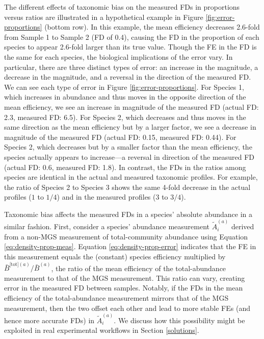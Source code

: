 \documentclass[
]{article}
\begin{document}
The different effects of taxonomic bias on the measured FDs in proportions versus ratios are illustrated in a hypothetical example in Figure \ref{fig:error-proportions} (bottom row).
In this example, the mean efficiency decreases 2.6-fold from Sample 1 to Sample 2 (FD of 0.4), causing the FD in the proportion of each species to appear 2.6-fold larger than its true value.
Though the FE in the FD is the same for each species, the biological implications of the error vary.
In particular, there are three distinct types of error: an increase in the magnitude, a decrease in the magnitude, and a reversal in the direction of the measured FD.
We can see each type of error in Figure \ref{fig:error-proportions}.
For Species 1, which increases in abundance and thus moves in the opposite direction of the mean efficiency, we see an increase in magnitude of the measured FD (actual FD: 2.3, measured FD: 6.5).
For Species 2, which decreases and thus moves in the same direction as the mean efficiency but by a larger factor, we see a decrease in magnitude of the measured FD (actual FD: 0.15, measured FD: 0.44).
For Species 2, which decreases but by a smaller factor than the mean efficiency, the species actually appears to increase---a reversal in direction of the measured FD (actual FD: 0.6, measured FD: 1.8).
In contrast, the FDs in the ratios among species are identical in the actual and measured taxonomic profiles.
For example, the ratio of Species 2 to Species 3 shows the same 4-fold decrease in the actual profiles (\(1\) to \(1/4\)) and in the measured profiles (\(3\) to \(3/4\)).

Taxonomic bias affects the measured FDs in a species' absolute abundance in a similar fashion.
First, consider a species' abundance measurement \(\tilde A_i^{(a)}\) derived from a non-MGS measurement of total-community abundance using Equation \eqref{eq:density-prop-meas}.
Equation \eqref{eq:density-prop-error} indicates that the FE in this measurement equals the (constant) species efficiency multiplied by \({\bar B^{{\text{[tot]}}(a)}}/{\bar B^{(a)}}\), the ratio of the mean efficiency of the total-abundance measurement to that of the MGS measurement.
This ratio can vary, creating error in the measured FD between samples.
Notably, if the FDs in the mean efficiency of the total-abundance measurement mirrors that of the MGS measurement, then the two offset each other and lead to more stable FEs (and hence more accurate FDs) in \(\tilde A_i^{(a)}\).
We discuss how this possibility might be exploited in real experimental workflows in Section \ref{solutions}.
\end{document}
